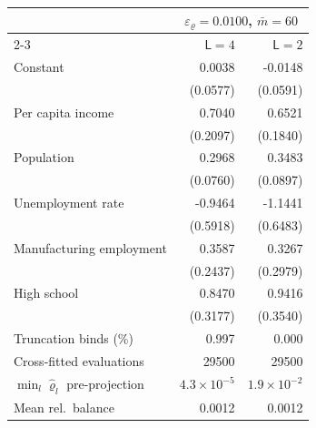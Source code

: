 \begin{tabular}{lrr}
\toprule
 & \multicolumn{2}{c}{$\varepsilon_\varrho = 0.0100$, $\bar m = 60$} \\
\cmidrule(lr){2-3}
 & $\mathsf L = 4$ & $\mathsf L = 2$ \\
\midrule
Constant & 0.0038 & -0.0148 \\
 & (0.0577) & (0.0591) \\
Per capita income & 0.7040 & 0.6521 \\
 & (0.2097) & (0.1840) \\
Population & 0.2968 & 0.3483 \\
 & (0.0760) & (0.0897) \\
Unemployment rate & -0.9464 & -1.1441 \\
 & (0.5918) & (0.6483) \\
Manufacturing employment & 0.3587 & 0.3267 \\
 & (0.2437) & (0.2979) \\
High school & 0.8470 & 0.9416 \\
 & (0.3177) & (0.3540) \\
\midrule
Truncation binds (\%) & 0.997 & 0.000 \\
Cross-fitted evaluations & 29500 & 29500 \\
$\min_l\hat\varrho_l$ pre-projection & $4.3 \times 10^{-5}$ & $1.9 \times 10^{-2}$ \\
Mean rel.\ balance & 0.0012 & 0.0012 \\
\bottomrule
\end{tabular}
